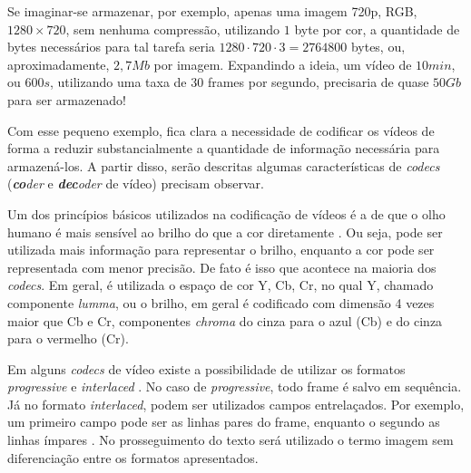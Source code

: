 \documentclass[cic,tc]{iiufrgs}
\begin{document}
Se imaginar-se armazenar, por exemplo, apenas uma imagem 720p, RGB, $1280\times720$, 
sem nenhuma compressão, utilizando $1$ byte por cor, a quantidade de bytes necessários 
para tal tarefa seria $1280\cdot720\cdot3 = 2764800$ bytes, ou, aproximadamente, $2,7Mb$
por imagem.
Expandindo a ideia, um vídeo de $10min$, ou $600s$, utilizando uma taxa de $30$ frames por segundo,
precisaria de quase $50Gb$ para ser armazenado!

Com esse pequeno exemplo, fica clara a necessidade de codificar os vídeos de forma a
reduzir substancialmente a quantidade de informação necessária para armazená-los.
A partir disso, serão descritas algumas características de \textit{codecs} 
(\emph{\textbf{co}der} e \emph{\textbf{dec}oder} de vídeo) precisam observar.

Um dos princípios básicos utilizados na codificação de vídeos é a de que o olho humano
é mais sensível ao brilho do que a cor diretamente \cite{SullivanH264}.
Ou seja, pode ser utilizada mais informação para representar o brilho, enquanto a cor
pode ser representada com menor precisão.
De fato é isso que acontece na maioria dos \emph{codecs}. 
Em geral, é utilizada o espaço de cor Y, Cb, Cr, no qual Y, chamado componente \emph{lumma},
ou o brilho, em geral é codificado com dimensão 4 vezes maior que Cb e Cr, componentes 
\emph{chroma} do cinza para o azul (Cb) e do cinza para o vermelho (Cr).

Em alguns \emph{codecs} de vídeo existe a possibilidade de utilizar os formatos
\emph{progressive} e \emph{interlaced} \cite{SullivanH264}.
No caso de \emph{progressive}, todo frame é salvo em sequência.
Já no formato \emph{interlaced}, podem ser utilizados campos entrelaçados.
Por exemplo, um primeiro campo pode ser as linhas pares do frame, enquanto o segundo
as linhas ímpares \cite{SullivanH264}.
No prosseguimento do texto será utilizado o termo imagem sem diferenciação entre os 
formatos apresentados.
\end{document}
